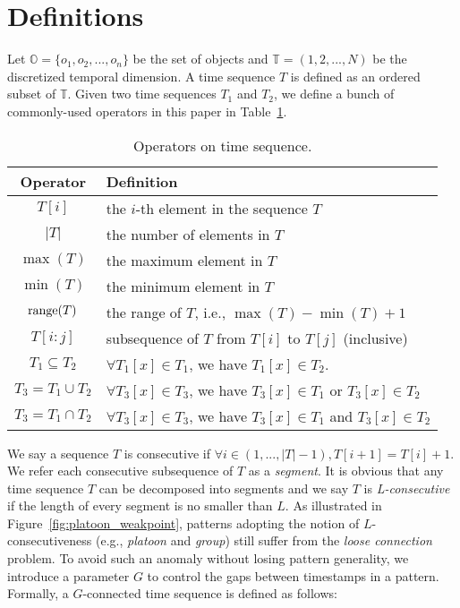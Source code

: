 \section{Definitions}
\label{sec:definition}
Let $\mathbb{O} = \{o_1 ,o_2,...,o_n\}$ be the set of objects and $\mathbb{T} =(1,2,...,N)$ be the discretized temporal dimension. A time sequence $T$ is defined as an ordered subset of $\mathbb{T}$. Given two time sequences $T_1$ and $T_2$, we define a bunch of commonly-used operators in this paper in Table~\ref{tbl:operators}.

\begin{table}[h]
\centering
\begin{tabular}{|c|l|}
\hline 
\textbf{Operator} & \textbf{Definition} \\ 
\hline
$T[i]$ & the $i$-th element in the sequence $T$ \\ 
\hline
$|T|$ & the number of elements in $T$\\
\hline
$\max(T)$ & the maximum element in $T$\\
\hline
$\min(T)$ & the minimum element in $T$\\
\hline
$\operatorname*{range}(T)$ & the range of $T$, i.e., $\max(T) - \min(T) +1$\\ 
\hline 
$T[i:j]$ & subsequence of $T$ from $T[i]$ to $T[j]$ (inclusive) \\ 
\hline
$T_1\subseteq T_2$ &  $\forall T_1[x]\in T_1$, we have $T_1[x]\in T_2$. \\\hline
$T_3=T_1\cup T_2$ & $\forall T_3[x]\in T_3$, we have $T_3[x]\in T_1$ or $T_3[x] \in T_2$\\ 
\hline
$T_3=T_1\cap T_2$ & $\forall T_3[x]\in T_3$, we have $T_3[x]\in T_1$ and $T_3[x] \in T_2$\\ 
\hline
\end{tabular}
\caption{Operators on time sequence.} \label{tbl:operators}
\end{table} 
 

We say a sequence $T$ is consecutive 
if $\forall i \in (1,...,|T|-1), T[i+1] = T[i] + 1$.  We refer each consecutive subsequence of $T$ as a \emph{segment}.
It is obvious that any time sequence $T$ can be decomposed into
segments and we say $T$ is \textit{L-consecutive}~\cite{li2015platoon} 
if the length of every segment is no smaller than $L$. As illustrated in Figure~\ref{fig:platoon_weakpoint}, patterns adopting the notion of $L$-consecutiveness (e.g., \emph{platoon} and \emph{group}) still suffer from the \emph{loose connection} problem. 
To avoid such an anomaly without losing pattern generality, we introduce a parameter $G$ to control the gaps between
timestamps in a pattern. Formally, a $G$-connected time sequence is defined as follows:

